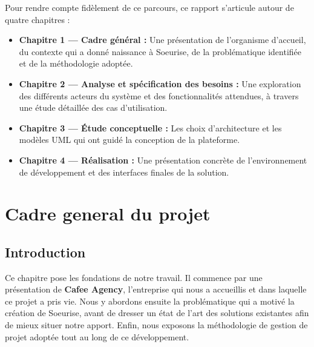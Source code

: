 \documentclass[12pt,a4paper]{report}
\begin{document}
	\medskip
	
	Pour rendre compte fidèlement de ce parcours, ce rapport s'articule autour 
	de quatre chapitres :
	
	\begin{itemize}
		\item \textbf{Chapitre 1 --- Cadre général :} Une présentation de 
		l'organisme d'accueil, du contexte qui a donné naissance à Soeurise, 
		de la problématique identifiée et de la méthodologie adoptée.
		
		\item \textbf{Chapitre 2 --- Analyse et spécification des besoins :} 
		Une exploration des différents acteurs du système et des fonctionnalités 
		attendues, à travers une étude détaillée des cas d'utilisation.
		
		\item \textbf{Chapitre 3 --- Étude conceptuelle :} Les choix 
		d'architecture et les modèles UML qui ont guidé la conception 
		de la plateforme.
		
		\item \textbf{Chapitre 4 --- Réalisation :} Une présentation concrète 
		de l'environnement de développement et des interfaces finales 
		de la solution.
	\end{itemize}
	\chapter{Cadre general du projet}
	
	
	
	\localtableofcontents
	\newpage
	
	\section{Introduction}
	Ce chapitre pose les fondations de notre travail. Il commence par une présentation 
	de \textbf{Cafee Agency}, l'entreprise qui nous a accueillis et dans laquelle ce 
	projet a pris vie. Nous y abordons ensuite la problématique qui a motivé la création 
	de Soeurise, avant de dresser un état de l'art des solutions existantes afin de mieux 
	situer notre apport. Enfin, nous exposons la méthodologie de gestion de projet adoptée 
	tout au long de ce développement.
	
\end{document}
